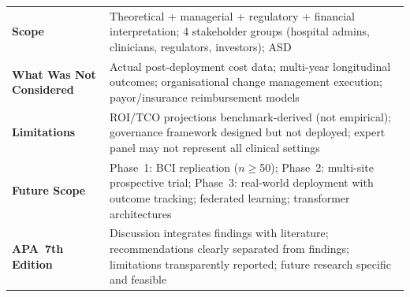 \begin{table}[!htbp]
\begin{tabularx}{\textwidth}{@{} L L @{}}
\addlinespace
\textbf{Scope} & Theoretical + managerial + regulatory + financial interpretation; 4 stakeholder groups (hospital admins, clinicians, regulators, investors); ASD \\
\addlinespace
\textbf{What Was Not Considered} & Actual post-deployment cost data; multi-year longitudinal outcomes; organisational change management execution; payor/insurance reimbursement models \\
\addlinespace
\textbf{Limitations} & ROI/TCO projections benchmark-derived (not empirical); governance framework designed but not deployed; expert panel may not represent all clinical settings \\
\addlinespace
\textbf{Future Scope} & Phase~1: BCI replication ($n\geq$50); Phase~2: multi-site prospective trial; Phase~3: real-world deployment with outcome tracking; federated learning; transformer architectures \\
\addlinespace
\textbf{APA~7th Edition} & Discussion integrates findings with literature; recommendations clearly separated from findings; limitations transparently reported; future research specific and feasible \\
\bottomrule
\end{tabularx}
\end{table}


